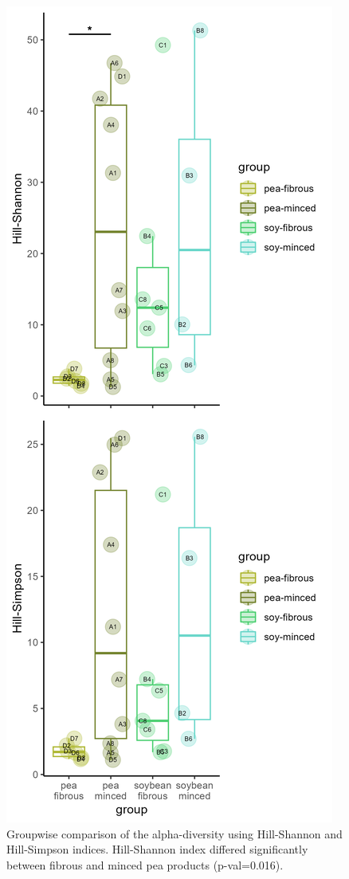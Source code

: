 \documentclass[preprint, 3p,
authoryear]{elsarticle} %
\begin{document}
\begin{figure}

{\centering \includegraphics[width=0.5\linewidth]{PlotDivByCov} 

}

\caption{\label{figSM1} Groupwise comparison of the alpha-diversity using Hill-Shannon and Hill-Simpson indices. Hill-Shannon index differed significantly between fibrous and minced pea products (p-val=0.016).}\label{fig:figSM1}
\end{figure}
\end{document}
